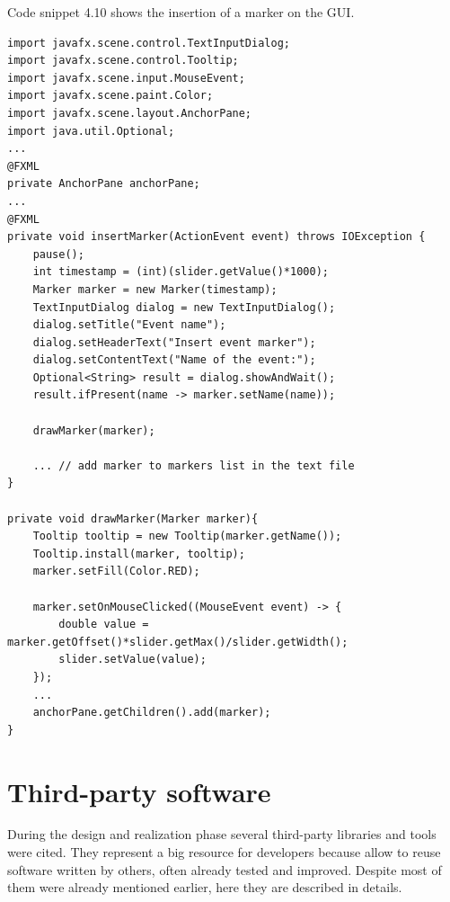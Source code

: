 \documentclass[binding=0.6cm,LaM]{sapthesis}
\begin{document}
Code snippet 4.10 shows the insertion of a marker on the GUI.
\\
\begin{lstlisting}[caption={Insert marker}, captionpos=b]
import javafx.scene.control.TextInputDialog;
import javafx.scene.control.Tooltip;
import javafx.scene.input.MouseEvent;
import javafx.scene.paint.Color;
import javafx.scene.layout.AnchorPane;
import java.util.Optional;
...
@FXML
private AnchorPane anchorPane;
...
@FXML
private void insertMarker(ActionEvent event) throws IOException {
	pause();
	int timestamp = (int)(slider.getValue()*1000);
	Marker marker = new Marker(timestamp);
	TextInputDialog dialog = new TextInputDialog();
	dialog.setTitle("Event name");
	dialog.setHeaderText("Insert event marker");
	dialog.setContentText("Name of the event:");
	Optional<String> result = dialog.showAndWait();
	result.ifPresent(name -> marker.setName(name));
	
	drawMarker(marker);
	
	... // add marker to markers list in the text file		
}

private void drawMarker(Marker marker){
	Tooltip tooltip = new Tooltip(marker.getName());
	Tooltip.install(marker, tooltip);
	marker.setFill(Color.RED);
        
	marker.setOnMouseClicked((MouseEvent event) -> {
		double value = marker.getOffset()*slider.getMax()/slider.getWidth();
		slider.setValue(value);
	});
	...
	anchorPane.getChildren().add(marker);
}

\end{lstlisting}




\section{Third-party software}
\label{sec:thirdparty}
During the design and realization phase several third-party libraries and tools were cited. They represent a big resource for developers because allow to reuse software written by others, often already tested and improved. Despite most of them were already mentioned earlier, here they are described in details.
\end{document}
